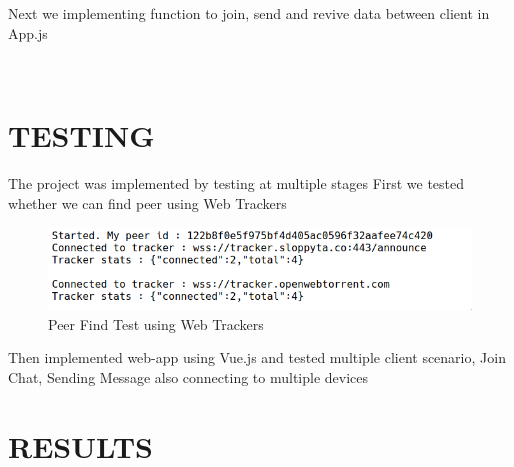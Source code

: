 \documentclass{fisatproject}
\begin{document}
    

Next we implementing function to join, send and revive data between client in App.js
         \vspace{0.6cm}
 	 \begin{lstlisting}[language=java]
 	 
 	 \end{lstlisting}


\chapter{TESTING}
The project was implemented by testing at multiple stages
First we tested whether we can find peer using Web Trackers
	\begin{center}
	\begin{figure}[h]
		
		\includegraphics[scale=.37]{testpeer.png}
		\caption{Peer Find Test using Web Trackers}
		
	\end{figure}
\end{center}

Then implemented web-app using Vue.js and tested multiple client scenario, Join Chat, Sending Message
also connecting to multiple devices
\chapter{RESULTS}
\end{document}

